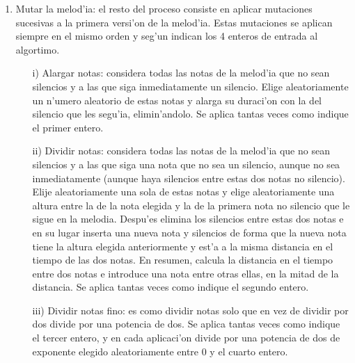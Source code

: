 \begin{enumerate}
        \item Mutar la melod'ia: el resto del proceso consiste en aplicar mutaciones sucesivas a la primera versi'on de la melod'ia. Estas mutaciones se aplican siempre en el mismo orden y seg'un indican los 4 enteros de entrada al algortimo.
                \begin{enumerate}
                \item[i)] Alargar notas: considera todas las notas de la melod'ia que no sean silencios y a las que siga inmediatamente un silencio. Elige aleatoriamente un n'umero aleatorio de estas notas y alarga su duraci'on con la del silencio que les segu'ia, elimin'andolo. Se aplica tantas veces como indique el primer entero.
                \item[ii)] Dividir notas: considera todas las notas de la melod'ia que no sean silencios y a las que siga una nota que no sea un silencio, aunque no sea inmediatamente (aunque haya silencios entre estas dos notas no silencio). Elije aleatoriamente una sola de estas notas y elige aleatoriamente una altura entre la de la nota elegida y la de la primera nota no silencio que le sigue en la melodia. Despu'es elimina los silencios entre estas dos notas e en su lugar inserta una nueva nota y silencios de forma que la nueva nota tiene la altura elegida anteriormente y est'a a la misma distancia en el tiempo de las dos notas. En resumen, calcula la distancia en el tiempo entre dos notas e introduce una nota entre otras ellas, en la mitad de la distancia. Se aplica tantas veces como indique el segundo entero.
                \item[iii)] Dividir notas fino: es como dividir notas solo que en vez de dividir por dos divide por una potencia de dos. Se aplica tantas veces como indique el tercer entero, y en cada aplicaci'on divide por una potencia de dos de exponente elegido aleatoriamente entre 0 y el cuarto entero.
                \end{enumerate}
        \end{enumerate}

